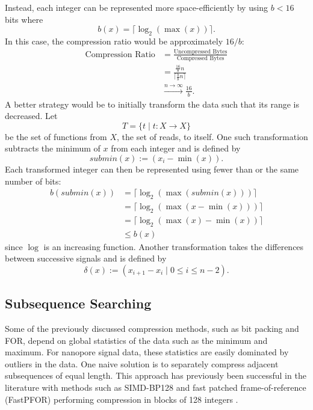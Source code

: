 Instead, each integer can be represented more space-efficiently by using $b<16$ bits where \[b(x)=\lceil\log_2(\max(x))\rceil.\] In this case, the compression ratio would be approximately $16/b$:
\begin{align*}
	\text{Compression Ratio} &= \frac{\text{Uncompressed Bytes}}{\text{Compressed Bytes}}\\
	&=\frac{\frac{16}{8}n}{\lceil\frac{b}{8}n\rceil}\\
	&\stackrel{n\to\infty}{\longrightarrow}\frac{16}{b}.
\end{align*}
A better strategy would be to initially transform the data such that its range is decreased.
Let \[T=\{t\mid t:X\to X\}\] be the set of functions from $X$, the set of reads, to itself. One such transformation subtracts the minimum of $x$ from each integer and is defined by \[ submin(x) := (x_i-\min(x)). \] Each transformed integer can then be represented using fewer than or the same number of bits:
\begin{align*}
	b(submin(x))&=\lceil\log_2(\max(submin(x)))\rceil\\
	&=\lceil\log_2(\max(x-\min(x)))\rceil\\
	&=\lceil\log_2(\max(x)-\min(x))\rceil\\
	&\le b(x)
\end{align*}
since $\log$ is an increasing function.
Another transformation takes the differences between successive signals and is defined by
\[ \delta(x):=(x_{i+1}-x_i\mid 0\le i\le n-2).\]

\subsection{Subsequence Searching}
Some of the previously discussed compression methods, such as bit packing and FOR, depend on global statistics of the data such as the minimum and maximum.
For nanopore signal data, these statistics are easily dominated by outliers in the data.
One naive solution is to separately compress adjacent subsequences of equal length.
This approach has previously been successful in the literature with methods such as SIMD-BP128 and fast patched frame-of-reference (FastPFOR) performing compression in blocks of 128 integers \cite{lemire-simd}.


